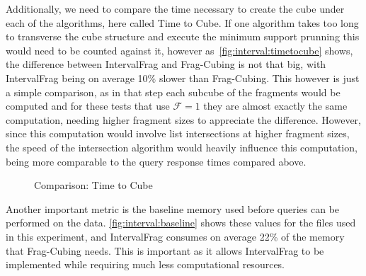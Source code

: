 Additionally, we need to compare the time necessary to create the cube under each of the algorithms, here called Time to Cube.
If one algorithm takes too long to transverse the cube structure and execute the minimum support prunning this would need to be counted against it, however as~\autoref{fig:interval:timetocube} shows, the difference between IntervalFrag and Frag-Cubing is not that big, with IntervalFrag being on average 10\% slower than Frag-Cubing.
This however is just a simple comparison, as in that step each subcube of the fragments would be computed and for these tests that use $\mathcal{F} = 1$ they are almost exactly the same computation, needing higher fragment sizes to appreciate the difference.
However, since this computation would involve list intersections at higher fragment sizes, the speed of the intersection algorithm would heavily influence this computation, being more comparable to the query response times compared above.

\begin{figure}[!htb]
  \caption{Comparison: Time to Cube}\label{fig:interval:timetocube}
  \vspace{6mm}
  \begin{center}
  \end{center}
  \vspace{2mm}
\end{figure}

Another important metric is the baseline memory used before queries can be performed on the data.
\autoref{fig:interval:baseline} shows these values for the files used in this experiment, and IntervalFrag consumes on average 22\% of the memory that Frag-Cubing needs.
This is important as it allows IntervalFrag to be implemented while requiring much less computational resources.

